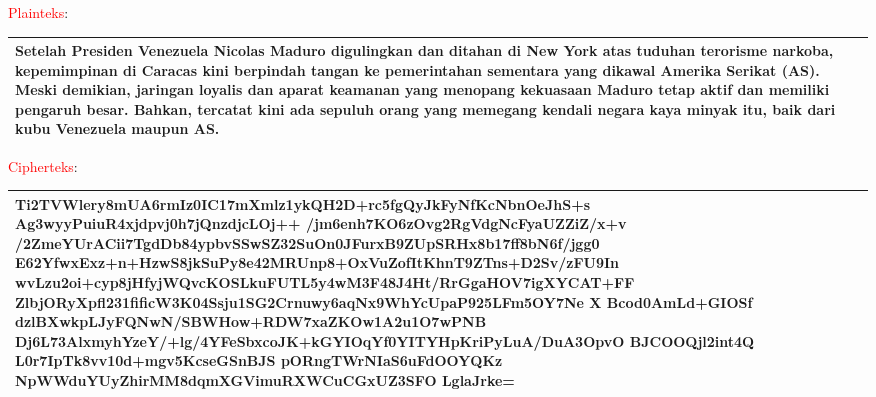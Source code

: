 \documentclass{article}
\begin{document}

\textcolor{red}{Plainteks}: \begin{center} \begin{tabular}{|p{}|} \hline Setelah Presiden Venezuela Nicolas Maduro digulingkan dan ditahan di New York atas tuduhan terorisme narkoba, kepemimpinan di Caracas kini berpindah tangan ke pemerintahan sementara yang dikawal Amerika Serikat (AS). Meski demikian, jaringan loyalis dan aparat keamanan yang menopang kekuasaan Maduro tetap aktif dan memiliki pengaruh besar. Bahkan, tercatat kini ada sepuluh orang yang memegang kendali negara kaya minyak itu, baik dari kubu Venezuela maupun AS. \\ \hline \end{tabular} \end{center} \vspace{10mm} \textcolor{red}{Cipherteks}: \begin{center} \begin{tabular}{|p{}|} \hline Ti2TVWlery8mUA6rmIz0IC17mXmlz1ykQH2D+rc5fgQyJkFyNfKcNbnOeJhS+s Ag3wyyPuiuR4xjdpvj0h7jQnzdjcLOj++ /jm6enh7KO6zOvg2RgVdgNcFyaUZZiZ/x+v /2ZmeYUrACii7TgdDb84ypbvSSwSZ32SuOn0JFurxB9ZUpSRHx8b17ff8bN6f/jgg0 E62YfwxExz+n+HzwS8jkSuPy8e42MRUnp8+OxVuZofItKhnT9ZTns+D2Sv/zFU9In wvLzu2oi+cyp8jHfyjWQvcKOSLkuFUTL5y4wM3F48J4Ht/RrGgaHOV7igXYCAT+FF ZlbjORyXpfl231fificW3K04Ssju1SG2Crnuwy6aqNx9WhYcUpaP925LFm5OY7Ne X Bcod0AmLd+GIOSf dzlBXwkpLJyFQNwN/SBWHow+RDW7xaZKOw1A2u1O7wPNB Dj6L73AlxmyhYzeY/+lg/4YFeSbxcoJK+kGYIOqYf0YITYHpKriPyLuA/DuA3OpvO BJCOOQjl2int4Q L0r7IpTk8vv10d+mgv5KcseGSnBJS pORngTWrNIaS6uFdOOYQKz NpWWduYUyZhirMM8dqmXGVimuRXWCuCGxUZ3SFO LglaJrke= \\ \hline \end{tabular} \end{center}
\end{document}

